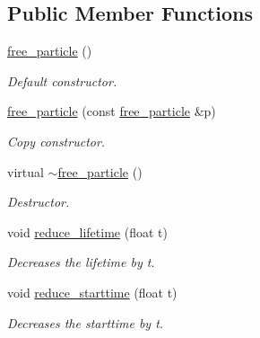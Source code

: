\subsection*{Public Member Functions}
\begin{DoxyCompactItemize}
\item 
\mbox{\label{classphysim_1_1particles_1_1free__particle_a49daf863274486e00c8adce24d78e3bb}} 
\hyperlink{classphysim_1_1particles_1_1free__particle_a49daf863274486e00c8adce24d78e3bb}{free\+\_\+particle} ()
\begin{DoxyCompactList}\small\item\em Default constructor. \end{DoxyCompactList}\item 
\mbox{\label{classphysim_1_1particles_1_1free__particle_aa075ca6679e0f74cacaba04a3457e782}} 
\hyperlink{classphysim_1_1particles_1_1free__particle_aa075ca6679e0f74cacaba04a3457e782}{free\+\_\+particle} (const \hyperlink{classphysim_1_1particles_1_1free__particle}{free\+\_\+particle} \&p)
\begin{DoxyCompactList}\small\item\em Copy constructor. \end{DoxyCompactList}\item 
\mbox{\label{classphysim_1_1particles_1_1free__particle_a14b490652a1ca90950382c86f55e510a}} 
virtual \hyperlink{classphysim_1_1particles_1_1free__particle_a14b490652a1ca90950382c86f55e510a}{$\sim$free\+\_\+particle} ()
\begin{DoxyCompactList}\small\item\em Destructor. \end{DoxyCompactList}\item 
void \hyperlink{classphysim_1_1particles_1_1free__particle_a8b8e76a24759a1e0a5d3b0d4933e31c1}{reduce\+\_\+lifetime} (float t)
\begin{DoxyCompactList}\small\item\em Decreases the lifetime by {\itshape t}. \end{DoxyCompactList}\item 
void \hyperlink{classphysim_1_1particles_1_1free__particle_a8f024371fb279e75bbfef1be83bce4bc}{reduce\+\_\+starttime} (float t)
\begin{DoxyCompactList}\small\item\em Decreases the starttime by {\itshape t}. \end{DoxyCompactList}\item 

\end{DoxyCompactItemize}
